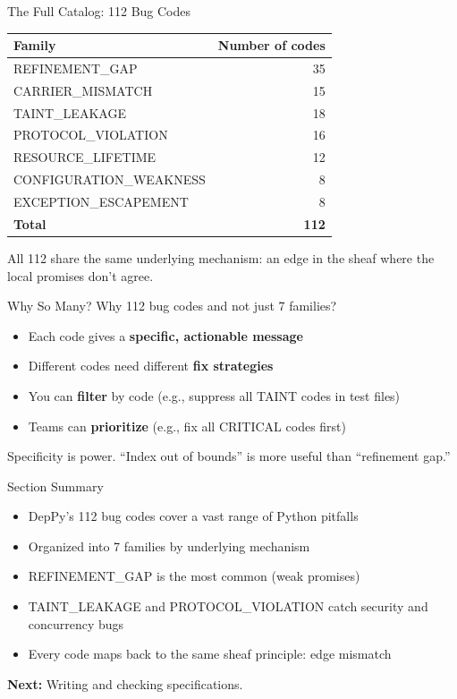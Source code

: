 \documentclass[aspectratio=169,10pt]{beamer}
\newcommand{\hint}[1]{\begin{center}
  \colorbox{hintbg}{\parbox{0.88\textwidth}{\centering\small #1}}\end{center}}
\begin{document}
\begin{frame}{The Full Catalog: 112 Bug Codes}
\begin{center}
{\small
\begin{tabular}{@{}lr@{}}
\textbf{Family} & \textbf{Number of codes} \\
\hline
REFINEMENT\_GAP         & 35 \\
CARRIER\_MISMATCH       & 15 \\
TAINT\_LEAKAGE          & 18 \\
PROTOCOL\_VIOLATION     & 16 \\
RESOURCE\_LIFETIME      & 12 \\
CONFIGURATION\_WEAKNESS & 8 \\
EXCEPTION\_ESCAPEMENT   & 8 \\
\hline
\textbf{Total}          & \textbf{112} \\
\end{tabular}}
\end{center}
\vspace{0.3em}
All 112 share the same underlying mechanism: an edge in the sheaf where the local promises don't agree.
\end{frame}

\begin{frame}{Why So Many?}
Why 112 bug codes and not just 7 families?
\vspace{0.3em}
\begin{itemize}
  \item Each code gives a \textbf{specific, actionable message}
  \item Different codes need different \textbf{fix strategies}
  \item You can \textbf{filter} by code (e.g., suppress all TAINT codes in test files)
  \item Teams can \textbf{prioritize} (e.g., fix all CRITICAL codes first)
\end{itemize}
\hint{Specificity is power. ``Index out of bounds'' is more useful than ``refinement gap.''}
\end{frame}

\begin{frame}{Section Summary}
\begin{itemize}
  \item DepPy's 112 bug codes cover a vast range of Python pitfalls
  \item Organized into 7 families by underlying mechanism
  \item REFINEMENT\_GAP is the most common (weak promises)
  \item TAINT\_LEAKAGE and PROTOCOL\_VIOLATION catch security and concurrency bugs
  \item Every code maps back to the same sheaf principle: edge mismatch
\end{itemize}
\vspace{0.3em}
\begin{center}
\textbf{Next:} Writing and checking specifications.
\end{center}
\end{frame}
\end{document}

